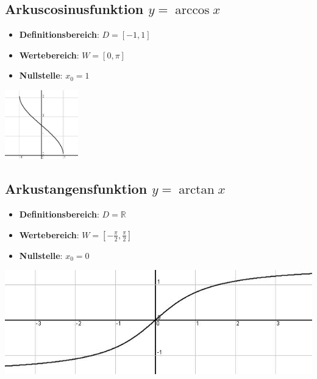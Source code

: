 \subsection*{Arkuscosinusfunktion $y = \arccos x$}
\begin{minipage}{.5\textwidth}
\begin{itemize}
	\item \textbf{Definitionsbereich}: $ D = [-1, 1] $
	\item \textbf{Wertebereich}: $ W = [0, \pi] $
	\item \textbf{Nullstelle}: $x_0 = 1$
\end{itemize}
\end{minipage}
\begin{minipage}{.5\textwidth}	
\includegraphics[height=3cm]{img/ACosF.jpg}
\end{minipage}

\subsection*{Arkustangensfunktion $y = \arctan x$}
\begin{minipage}{.5\textwidth}
\begin{itemize}
	\item \textbf{Definitionsbereich}: $ D = \mathbb{R} $
	\item \textbf{Wertebereich}: $ W = [-\frac{\pi}{2}, \frac{\pi}{2}] $
	\item \textbf{Nullstelle}: $x_0 = 0$
\end{itemize}
\end{minipage}
\begin{minipage}{.5\textwidth}
		\includegraphics[width=\textwidth]{img/ATanF.jpg}
\end{minipage}

